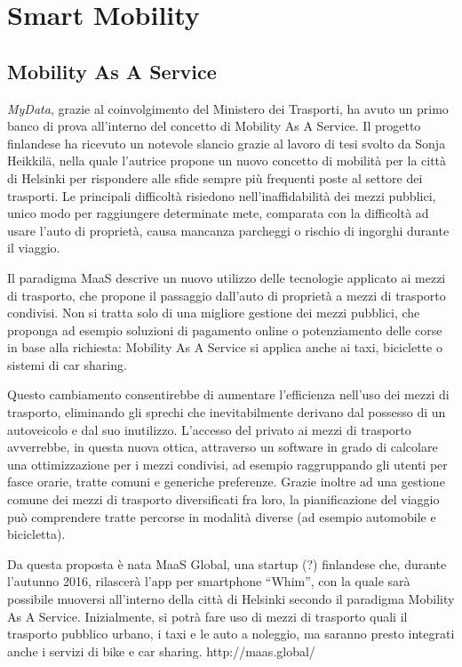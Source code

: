 \chapter{Smart Mobility}
\label{capitolo2}
\thispagestyle{empty}

\cite{mydatawebsite}
\section{Mobility As A Service}
\textit{MyData}, grazie al coinvolgimento del Ministero dei Trasporti, ha avuto un primo banco di prova all’interno del concetto di Mobility As A Service. Il progetto finlandese ha ricevuto un notevole slancio grazie al lavoro di tesi svolto da Sonja Heikkil\"a\cite{mastersonjaheikkil}, nella quale l’autrice propone un nuovo concetto di mobilit\`a per la citt\`a di Helsinki per rispondere alle sfide sempre pi\`u frequenti poste al settore dei trasporti. Le principali difficolt\`a risiedono nell’inaffidabilit\`a dei mezzi pubblici, unico modo per raggiungere determinate mete, comparata con la difficolt\`a ad usare l’auto di propriet\`a, causa mancanza parcheggi o rischio di ingorghi durante il viaggio.

Il paradigma MaaS descrive un nuovo utilizzo delle tecnologie applicato ai mezzi di trasporto, che propone il passaggio dall’auto di propriet\`a a mezzi di trasporto condivisi. Non si tratta solo di una migliore gestione dei mezzi pubblici, che proponga ad esempio soluzioni di pagamento online o potenziamento delle corse in base alla richiesta: Mobility As A Service si applica anche ai taxi, biciclette o sistemi di car sharing. 

Questo cambiamento consentirebbe di aumentare l’efficienza nell’uso dei mezzi di trasporto, eliminando gli sprechi che inevitabilmente derivano dal possesso di un autoveicolo e dal suo inutilizzo. L’accesso del privato ai mezzi di trasporto avverrebbe, in questa nuova ottica, attraverso un software in grado di calcolare una ottimizzazione per i mezzi condivisi, ad esempio raggruppando gli utenti per fasce orarie, tratte comuni e generiche preferenze. Grazie inoltre ad una gestione comune dei mezzi di trasporto diversificati fra loro, la pianificazione del viaggio pu\`o comprendere tratte percorse in modalit\`a diverse (ad esempio automobile e bicicletta).

Da questa proposta \`e nata MaaS Global\cite{maasglobal}, una startup (?) finlandese che, durante l’autunno 2016, rilascer\`a l’app per smartphone “Whim”, con la quale sar\`a possibile muoversi all’interno della citt\`a di Helsinki secondo il paradigma Mobility As A Service. Inizialmente, si potr\`a fare uso di mezzi di trasporto quali il trasporto pubblico urbano, i taxi e le auto a noleggio, ma saranno presto integrati anche i servizi di bike e car sharing. http://maas.global/

